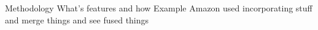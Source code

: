 Methodology
What's features and how
Example 
Amazon used incorporating stuff and merge things and see fused things
